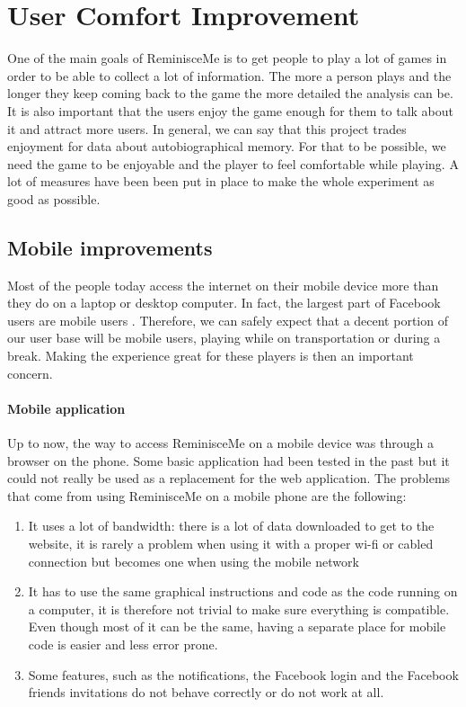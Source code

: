 \chapter{User Comfort Improvement}
One of the main goals of ReminisceMe is to get people to play a lot of games in order to be able to collect a lot of information. The more a person plays and the longer they keep coming back to the game the more detailed the analysis can be. It is also important that the users enjoy the game enough for them to talk about it and attract more users. In general, we can say that this project trades enjoyment for data about autobiographical memory. For that to be possible, we need the game to be enjoyable and the player to feel comfortable while playing. A lot of measures have been been put in place to make the whole experiment as good as possible.
\section{Mobile improvements}
Most of the people today access the internet on their mobile device more than they do on a laptop or desktop computer. In fact, the largest part of Facebook users are mobile users \cite{mobileusage}. Therefore, we can safely expect that a decent portion of our user base will be mobile users, playing while on transportation or during a break. Making the experience great for these players is then an important concern.
\subsubsection{Mobile application}
Up to now, the way to access ReminisceMe on a mobile device was through a browser on the phone. Some basic application had been tested in the past but it could not really be used as a replacement for the web application. The problems that come from using ReminisceMe on a mobile phone are the following:
\begin{enumerate}
	\item It uses a lot of bandwidth: there is a lot of data downloaded to get to the website, it is rarely a problem when using it with a proper wi-fi or cabled connection but becomes one when using the mobile network
	\item It has to use the same graphical instructions and code as the code running on a computer, it is therefore not trivial to make sure everything is compatible. Even though most of it can be the same, having a separate place for mobile code is easier and less error prone.
	\item Some features, such as the notifications, the Facebook login and the Facebook friends invitations do not behave correctly or do not work at all.
\end{enumerate}

